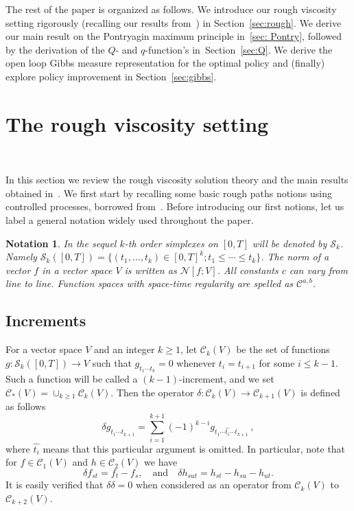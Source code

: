 \documentclass[12pt,reqno]{amsart}
\numberwithin{equation}{section}  %
\newcommand{\der}{\delta}
\newcommand{\1}{{\bf 1}}
\newcommand{\2}{{\bf 2}}
\newcommand{\cac}{\mathcal C}
\newcommand{\cn}{\mathcal N}
\newcommand{\cs}{\mathcal S}
\newtheorem{notation}[theorem]{Notation}
\theoremstyle{remark}
\theoremstyle{remark}
\newcommand{\beq}{\begin{equation}}
\newcommand{\eeq}{\end{equation}}
\begin{document}
The rest of the paper is organized as follows. We introduce our rough viscosity setting rigorously (recalling our results from~\cite{CHT}) in Section~\ref{sec:rough}. We derive our main result on the Pontryagin maximum principle in~\ref{sec: Pontry}, followed by the derivation of the $Q$- and $q$-function's in~Section~\ref{sec:Q}. We derive the open loop Gibbs measure representation for the optimal policy and (finally) explore policy improvement in Section~\ref{sec:gibbs}.





\section{The rough viscosity setting}~\label{sec:rough}

In this section we review the rough viscosity {solution theory} and the main results obtained in~\cite{CHT}. We first start by recalling some basic rough paths notions using controlled processes, borrowed from~\cite{gubinelli}. Before introducing our first notions, let us label a general notation widely used throughout the paper.

\begin{notation}
In the sequel $k$-th order simplexes on $[0,T]$ will be denoted by $\cs_{k}$. Namely 
$\cs_k([0,T]) = \{ (t_1, \ldots, t_k) \in [0,T]^k; t_1 \leq \cdots \leq t_k \}$. The norm of a vector $f$ in a vector space $V$ is written as $\cn [f; V]$. All constants $c$ can vary from line to line. Function spaces with space-time regularity are spelled as $\cac^{a,b}$.
\end{notation}

\subsection{Increments}\label{sec:increm}
For a vector space $V$ and an integer $k \geq 1$, let $\cac_k(V)$ be the set of functions $g:\mathcal{S}_{k}([0,T]) \to V$ such that $g_{t_1 \cdots t_k} = 0$ whenever $t_i = t_{i+1}$ for some $i \leq {k-1}$. Such a function will be called a $(k-1)$-increment, and we set $\cac_{*}(V) = \cup_{k \geq 1} \cac_{k}(V)$. Then the operator $\der : \cac_{k}(V) \to \cac_{k+1}(V)$ is defined as follows
\begin{equation}\label{eq:def-delta}
{\der g}_{t_1 \cdots t_{k+1}} = \sum_{i = 1}^{k+1} (-1)^{k-i} g_{t_1\cdots \hat{t_i} \cdots t_{k+1}} \, ,
\end{equation} 
where $\hat{t_{i}}$ means that this particular argument is omitted.
In particular, note that for $f \in \cac_1(V)$ and $h \in \cac_2(V)$ we have
\beq\label{eq:der}
\der f_{st} = f_t - f_s, \quad \text{and} \quad \der h_{sut} = h_{st} - h_{su} -h_{ut}. 
\eeq
It is easily verified that $\der \der = 0$ when considered as an operator from $\cac_{k}(V)$ to $\cac_{k+2}(V)$.
\end{document}
